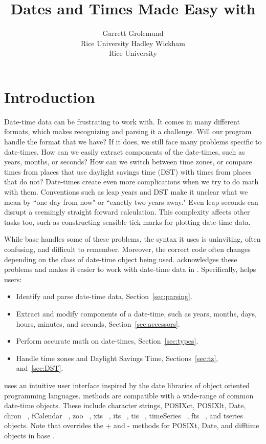 \documentclass[article]{jss}
\author{Garrett Grolemund\\Rice University \And 
        Hadley Wickham\\Rice University}
\title{Dates and Times Made Easy with \pkg{lubridate}}
\begin{document}
\section{Introduction}

Date-time data can be frustrating to work with. It comes in many different formats, which makes recognizing and parsing it a challenge. Will our program handle the format that we have? If it does, we still face many problems specific to date-times. How can we easily extract components of the date-times, such as years, months, or seconds? How can we switch between time zones, or compare times from places that use daylight savings time (DST) with times from places that do not? Date-times create even more complications when we try to do math with them. Conventions such as leap years and DST make it unclear what we mean by ``one day from now" or ``exactly two years away."  Even leap seconds can disrupt a seemingly straight forward calculation.  This complexity affects other tasks too, such as constructing sensible tick marks for plotting date-time data.

While base  \citep{R} handles some of these problems, the syntax it uses is uninviting, often confusing, and difficult to remember. Moreover, the correct  code often changes depending on the class of date-time object being used.  acknowledges these problems and makes it easier to work with date-time data in . Specifically,  helps users:

\begin{itemize}
   \item Identify and parse date-time data, Section~\ref{sec:parsing}.
   
    \item Extract and modify components of a date-time, such as years, months, days, hours, minutes, and seconds, Section~\ref{sec:accessors}.
  
  \item Perform accurate math on date-times, Section~\ref{sec:types}.
    
  \item Handle time zones and Daylight Savings Time, Sections~\ref{sec:tz}, and~\ref{sec:DST}.
  
\end{itemize}

 uses an intuitive user interface inspired by the date libraries of object oriented programming languages.   methods are compatible with a wide-range of common date-time objects. These include character strings, POSIXct, POSIXlt, Date, chron ~\citep{chron}, fCalendar ~\citep{fCalendar}, zoo ~\citep{zoo}, xts ~\citep{xts}, its ~\citep{its}, tis ~\citep{tis}, timeSeries ~\citep{timeSeries}, fts ~\citep{fts}, and tseries ~\citep{tseries} objects. Note that  overrides the + and - methods for POSIXt, Date, and difftime objects in base .
\end{document}
